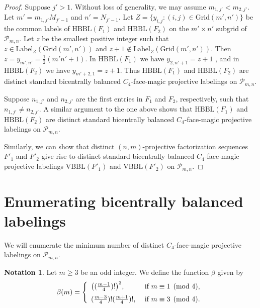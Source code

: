 \documentclass[12pt]{amsart}
\theoremstyle{definition}
\newtheorem{notation}[definition]{Notation}
\theoremstyle{plain}
\begin{document}
\begin{proof}
  Suppose $j'>1$.
  Without loss of generality, we may assume $m_{1,j'} < m_{2,j'}$.
  Let $m'=m_{1,j'} M_{j' -1}$ and $n'=N_{j' -1}$.
  Let $Z= \{ y_{i,j} : (i,j) \in \mathrm{Grid}(m',n')\}$ be the common labels of
  $\mathrm{HBBL}(F_1)$ and $\mathrm{HBBL}(F_2)$ on the $m' \times n'$ subgrid of $\mathcal{P}_{m,n}$.
  Let $z$ be the smallest positive integer such that $z\in \mathrm{Label}_{Z}(\mathrm{Grid}(m',n'))$
  and $z+1\notin \mathrm{Label}_{Z}(\mathrm{Grid}(m',n'))$.
  Then $z=y_{m',n'}=\tfrac{1}{2}(m' n'+1)$.
  In $\mathrm{HBBL}(F_1)$ we have $y_{2,n' +1}=z+1$ , and
  in $\mathrm{HBBL}(F_2)$ we have $y_{m' +2,1}=z+1$.
  Thus $\mathrm{HBBL}(F_1)$ and $\mathrm{HBBL}(F_2)$ are distinct standard bicentrally balanced $C_4$-face-magic projective labelings on $\mathcal{P}_{m,n}$.

  Suppose $n_{1,j'}$ and $n_{2,j'}$ are the first entries in $F_1$ and $F_2$, respectively, such that  $n_{1,j'} \ne n_{2,j'}$.
  A similar argument to the one above shows that $\mathrm{HBBL}(F_1)$ and $\mathrm{HBBL}(F_2)$ are distinct
  standard bicentrally balanced $C_4$-face-magic projective labelings on $\mathcal{P}_{m,n}$.

  Similarly, we can show that distinct $(n,m)$-projective factorization sequences $F'_1$ and $F'_2$ give rise
   to distinct standard bicentrally balanced $C_4$-face-magic projective labelings $\mathrm{VBBL}(F'_1)$ and $\mathrm{VBBL}(F'_2)$ on $\mathcal{P}_{m,n}$.
\end{proof}

\section{Enumerating bicentrally balanced labelings}

We will enumerate the minimum number of distinct $C_4$-face-magic projective labelings on $\mathcal{P}_{m,n}$.

\begin{notation}
  Let $m\geqslant 3$ be an odd integer.
  We define the function $\beta$ given by
  \begin{equation*}\label{eqnBetaFunction}
    \beta(m) = \left\{ \begin{array}{ll}
   \bigl( ( \tfrac{m-1}{4} )! \bigr)^2, & \mbox{ if } m\equiv 1\pmod{4}, \\[\medskipamount]
 ( \tfrac{m-3}{4} )! ( \tfrac{m+1}{4} )!, & \mbox{ if } m\equiv 3\pmod{4}.
\end{array} \right.
  \end{equation*}
\end{notation}
\end{document}
